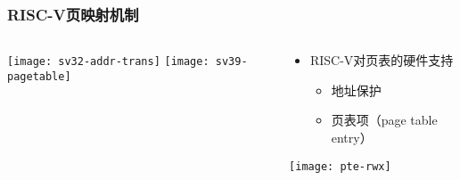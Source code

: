 \begin{frame}   
	\frametitle{RISC-V页映射机制}
	
	\begin{columns}
		
		\begin{column}{.5\textwidth}
			\centering
			\texttt{[image: sv32-addr-trans]}
			\texttt{[image: sv39-pagetable]}

			
		\end{column}
		
		
		\begin{column}{.5\textwidth}
			
			\begin{itemize}\large
				\item RISC-V对页表的硬件支持
				\begin{itemize}
					\item 地址保护
					\item 页表项（page table entry）
					
					
				\end{itemize}
			\end{itemize}
			\texttt{[image: pte-rwx]}
		\end{column}
		
		
	\end{columns}
	
\end{frame}



